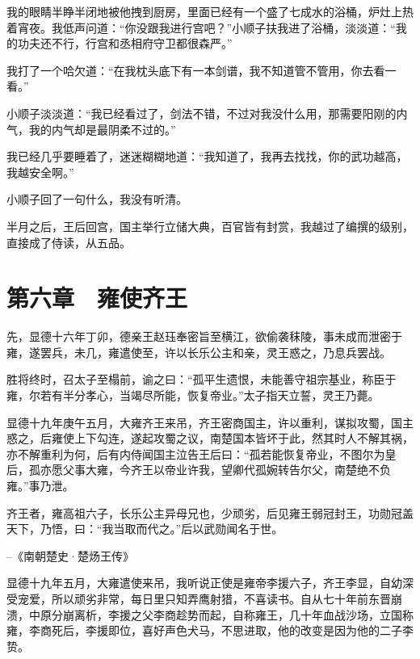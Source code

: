 我的眼睛半睁半闭地被他拽到厨房，里面已经有一个盛了七成水的浴桶，炉灶上热着宵夜。我低声问道：“你没跟我进行宫吧？”小顺子扶我进了浴桶，淡淡道：“我的功夫还不行，行宫和丞相府守卫都很森严。”

我打了一个哈欠道：“在我枕头底下有一本剑谱，我不知道管不管用，你去看一看。”

小顺子淡淡道：“我已经看过了，剑法不错，不过对我没什么用，那需要阳刚的内气，我的内气却是最阴柔不过的。”

我已经几乎要睡着了，迷迷糊糊地道：“我知道了，我再去找找，你的武功越高，我越安全啊。”

小顺子回了一句什么，我没有听清。

半月之后，王后回宫，国主举行立储大典，百官皆有封赏，我越过了编撰的级别，直接成了侍读，从五品。

\chapter{第六章　雍使齐王}

先，显德十六年丁卯，德亲王赵珏奉密旨至横江，欲偷袭秣陵，事未成而泄密于雍，遂罢兵，未几，雍遣使至，许以长乐公主和亲，灵王惑之，乃息兵罢战。

胜将终时，召太子至榻前，谕之曰：“孤平生遗恨，未能善守祖宗基业，称臣于雍，尔若有半分孝心，当竭尽所能，恢复帝业。”太子指天立誓，灵王乃薨。

显德十九年庚午五月，大雍齐王来吊，齐王密商国主，许以重利，谋拟攻蜀，国主惑之，后雍使上下勾连，遂起攻蜀之议，南楚国本皆坏于此，然其时人不解其祸，亦不解重利为何，后有内侍闻国主泣告王后曰：“孤若能恢复帝业，不图尔为皇后，孤亦愿父事大雍，今齐王以帝业许我，望卿代孤婉转告尔父，南楚绝不负雍。”事乃泄。

齐王者，雍高祖六子，长乐公主异母兄也，少顽劣，后见雍王弱冠封王，功勋冠盖天下，乃悟，曰：“我当取而代之。”后以武勋闻名于世。

--《南朝楚史·楚炀王传》

显德十九年五月，大雍遣使来吊，我听说正使是雍帝李援六子，齐王李显，自幼深受宠爱，所以顽劣非常，每日里只知弄鹰射猎，不喜读书。自从七十年前东晋崩溃，中原分崩离析，李援之父李商趁势而起，自称雍王，几十年血战沙场，立国称雍，李商死后，李援即位，喜好声色犬马，不思进取，他的改变是因为他的二子李贽。

